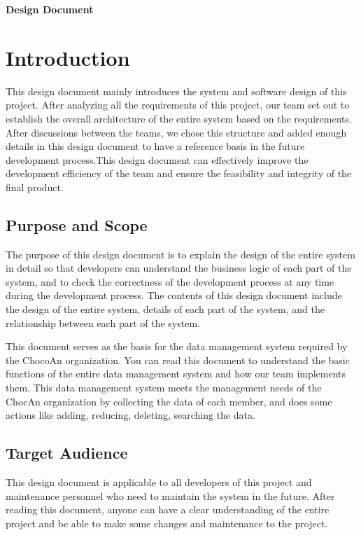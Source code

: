 \documentclass{article}
\renewcommand{\maketitle}{
   \begin{center}
      {\Huge \bfseries Design Document}
   \end{center}
}
\begin{document}
\maketitle
\tableofcontents
\pagebreak

\section{Introduction}
This design document mainly introduces the system and software design of this project. After analyzing all the requirements of this project, our team set out to establish the overall architecture of the entire system based on the requirements. After discussions between the teams, we chose this structure and added enough details in this design document  to have a reference basis in the future development process.This design document can effectively improve the development efficiency of the team and ensure the feasibility and integrity of the final product.

\subsection{Purpose and Scope}
The purpose of this design document is to explain the design of the entire system in detail so that developers can understand the business logic of each part of the system, and to check the correctness of the development process at any time during the development process. The contents of this design document include the design of the entire system, details of each part of the system, and the relationship between each part of the system.

This document serves as the basis for the data management system required by the ChocoAn organization. You can read this document to understand the basic functions of the entire data management system and how our team implements them. This data management system meets the management needs of the ChocAn organization by collecting the data of each member, and does some actions like  adding, reducing, deleting, searching the data.

\subsection{Target Audience}
This design document is applicable to all developers of this project and maintenance personnel who need to maintain the system in the future. After reading this document, anyone can have a clear understanding of the entire project and be able to make some changes and maintenance to the project.
\end{document}
